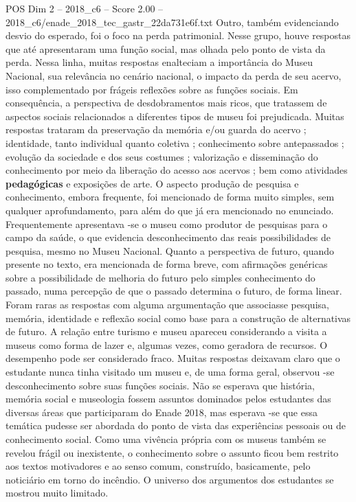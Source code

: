 \begin{textsample}{POS Dim 2 – 2018\_c6 – Score 2.00 – 2018\_c6/enade\_2018\_tec\_gastr\_22da731e6f.txt}
Outro, também evidenciando desvio do esperado, foi o foco na perda patrimonial.
Nesse grupo, houve respostas que até apresentaram uma função social, mas olhada pelo ponto de vista da perda.
Nessa linha, muitas respostas enalteciam a importância do Museu Nacional, sua relevância no cenário nacional, o impacto da perda de seu acervo, isso complementado por frágeis reflexões sobre as funções sociais.
Em consequência, a perspectiva de desdobramentos mais ricos, que tratassem de aspectos sociais relacionados a diferentes tipos de museu foi prejudicada.
Muitas respostas trataram da preservação da memória e/ou guarda do acervo ; identidade, tanto individual quanto coletiva ; conhecimento sobre antepassados ; evolução da sociedade e dos seus costumes ; valorização e disseminação do conhecimento por meio da liberação do acesso aos acervos ; bem como atividades \textbf{pedagógicas} e exposições de arte.
O aspecto produção de pesquisa e conhecimento, embora frequente, foi mencionado de forma muito simples, sem qualquer aprofundamento, para além do que já era mencionado no enunciado.
Frequentemente apresentava -se o museu como produtor de pesquisas para o campo da saúde, o que evidencia desconhecimento das reais possibilidades de pesquisa, mesmo no Museu Nacional.
Quanto a perspectiva de futuro, quando presente no texto, era mencionada de forma breve, com afirmações genéricas sobre a possibilidade de melhoria do futuro pelo simples conhecimento do passado, numa percepção de que o passado determina o futuro, de forma linear.
Foram raras as respostas com alguma argumentação que associasse pesquisa, memória, identidade e reflexão social como base para a construção de alternativas de futuro.
A relação entre turismo e museu apareceu considerando a visita a museus como forma de lazer e, algumas vezes, como geradora de recursos.
O desempenho pode ser considerado fraco.
Muitas respostas deixavam claro que o estudante nunca tinha visitado um museu e, de uma forma geral, observou -se desconhecimento sobre suas funções sociais.
Não se esperava que história, memória social e museologia fossem assuntos dominados pelos estudantes das diversas áreas que participaram do Enade 2018, mas esperava -se que essa temática pudesse ser abordada do ponto de vista das experiências pessoais ou de conhecimento social.
Como uma vivência própria com os museus também se revelou frágil ou inexistente, o conhecimento sobre o assunto ficou bem restrito aos textos motivadores e ao senso comum, construído, basicamente, pelo noticiário em torno do incêndio.
O universo dos argumentos dos estudantes se mostrou muito limitado.

\end{textsample}
